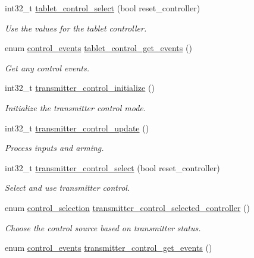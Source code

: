 \begin{DoxyCompactItemize}
int32\-\_\-t \hyperlink{group___control_ga72ecc808e52960fdd4fc2fe42bf5f633}{tablet\-\_\-control\-\_\-select} (bool reset\-\_\-controller)
\begin{DoxyCompactList}\small\item\em \-Use the values for the tablet controller. \end{DoxyCompactList}\item 
enum \hyperlink{group___control_ga6db279174b366abaad3f5de70b10655c}{control\-\_\-events} \hyperlink{group___control_gaac5e3efaaa07ab552af74fecf4726748}{tablet\-\_\-control\-\_\-get\-\_\-events} ()
\begin{DoxyCompactList}\small\item\em \-Get any control events. \end{DoxyCompactList}\item 
int32\-\_\-t \hyperlink{group___control_ga27653bb9e2abe9498b31e9f748f158d8}{transmitter\-\_\-control\-\_\-initialize} ()
\begin{DoxyCompactList}\small\item\em \-Initialize the transmitter control mode. \end{DoxyCompactList}\item 
int32\-\_\-t \hyperlink{group___control_gad28dba2f07e1f4fe872ccf01941c3c84}{transmitter\-\_\-control\-\_\-update} ()
\begin{DoxyCompactList}\small\item\em \-Process inputs and arming. \end{DoxyCompactList}\item 
int32\-\_\-t \hyperlink{group___control_ga6ffb050d1f10ab7aa441ce65629e26bd}{transmitter\-\_\-control\-\_\-select} (bool reset\-\_\-controller)
\begin{DoxyCompactList}\small\item\em \-Select and use transmitter control. \end{DoxyCompactList}\item 
enum \hyperlink{group___control_ga61438f5375f5e08187c7e12f13723afd}{control\-\_\-selection} \hyperlink{group___control_gacf816af6b4ab2c23707b55eb6b3281a0}{transmitter\-\_\-control\-\_\-selected\-\_\-controller} ()
\begin{DoxyCompactList}\small\item\em \-Choose the control source based on transmitter status. \end{DoxyCompactList}\item 
enum \hyperlink{group___control_ga6db279174b366abaad3f5de70b10655c}{control\-\_\-events} \hyperlink{group___control_ga51dc43f87515d8de90aebb1465578212}{transmitter\-\_\-control\-\_\-get\-\_\-events} ()

\end{DoxyCompactItemize}
